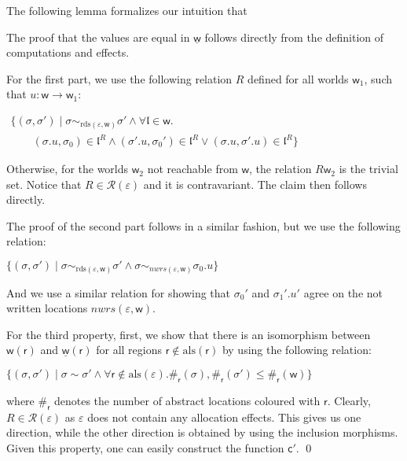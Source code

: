 \documentclass[orivec]{llncs}
\renewcommand{\paragraph}[1]{\noindent {\bf #1}}
\newcommand{\und}[1]{\underline{#1}}
\newcommand{\rdsin}[1]{\mathrm{rds}({#1})}
\newcommand{\alsin}[1]{\mathrm{als}({#1})}
\newcommand{\eff}{\varepsilon}
\newcommand{\regid}{\ensuremath{\mathsf{r}}}
\newcommand{\nwrs}{{\ensuremath{\mathit{nwrs}}}}
\renewenvironment{proof}{\vspace{-1mm} \noindent {\bf Proof}\quad}{\qed}
\newcommand{\loc}{\mathfrak{l}}
\newcommand\w{\ensuremath{\mathsf{w}}\xspace}
\newcommand\cval{\ensuremath{\mathsf{c}}\xspace}
\newcommand\Rscr{\ensuremath{\mathcal{R}}\xspace}
\begin{document}
The following lemma formalizes our intuition that 

\paragraph{Lemma~\ref{lemmasix}}
\begin{proof}
The proof that the values are equal in $\und{\w}$ follows directly from 
the definition of computations and effects.


For the first part,  we use the following relation $R$ defined for all
worlds $\w_1$, such that $u : \w \to \w_1$:

\(
\begin{array}{l}
 \{(\sigma, \sigma') \mid \sigma \sim_{\rdsin{\eff, \w}} \sigma' 
\land \forall \loc \in \w.\\
 \qquad (\sigma.u, \sigma_0) \in \loc^R \land
(\sigma'.u, \sigma_0') \in \loc^R \lor (\sigma.u, \sigma'.u) \in
\loc^R\}
\end{array}
\)

\noindent
Otherwise, for the worlds $\w_2$ not reachable from \w, the relation
$R\w_2$ is the trivial set. Notice that $R \in \Rscr(\eff)$ and it is
contravariant. The claim then 
follows directly.

The proof of the second part follows in a similar fashion, but we use the
following relation:

\(
\{(\sigma, \sigma') \mid \sigma \sim_{\rdsin{\eff, \w}} \sigma' 
\land \sigma \sim_{\nwrs(\eff, \w)} \sigma_0.u \}
\)

\noindent
And we use a similar relation for showing that $\sigma_0'$ and
$\sigma_1'.u'$ agree on the not written locations $\nwrs(\eff, \w)$.

For the third property, first, we show that there is an
isomorphism between $\w(\regid)$ and $\und{\w}(\regid)$ for all regions
$\regid \notin \alsin{\regid}$ by using the following relation:

\(
\{(\sigma, \sigma') \mid \sigma \sim \sigma' \land \forall
\regid \notin \alsin{\eff}. \#_\regid(\sigma), \#_\regid(\sigma')
\leq \#_\regid(\w) \} 
\)

\noindent
where $\#_\regid$ denotes the number of abstract locations coloured with 
$\regid$.
Clearly, $R \in
\Rscr(\eff)$ as $\eff$ does not contain any allocation effects. This gives
us one direction, while the other direction is obtained by using the
inclusion morphisms. Given this property, one can easily construct the 
function $\cval'$.
\end{proof}
\end{document}
